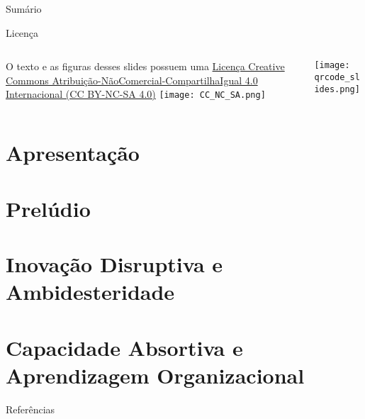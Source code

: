 \maketitle

\begin{frame}{Sumário}
    \tableofcontents
\end{frame}

\begin{frame}{Licença}
    \begin{columns}
        \begin{column}{0.5\textwidth}
            O texto e as figuras desses slides possuem uma
            \href{https://creativecommons.org/licenses/by-nc-sa/4.0/deed.pt}{Licença
            Creative Commons
            Atribuição-NãoComercial-CompartilhaIgual 4.0 Internacional (CC BY-NC-SA 4.0)}
            \vfill
            \centering
            \vspace{1em}
            \texttt{[image: CC\_NC\_SA.png]}
        \end{column}
        \begin{column}{0.5\textwidth}
            \centering
            \texttt{[image: qrcode\_slides.png]}
        \end{column}
    \end{columns}
    \vfill
\end{frame}

\section{Apresentação}


\section{Prelúdio}


\section{Inovação Disruptiva e Ambidesteridade}


\section{Capacidade Absortiva e Aprendizagem Organizacional}


\begin{frame}[allowframebreaks]{Referências}
	\printbibliography
\end{frame}
